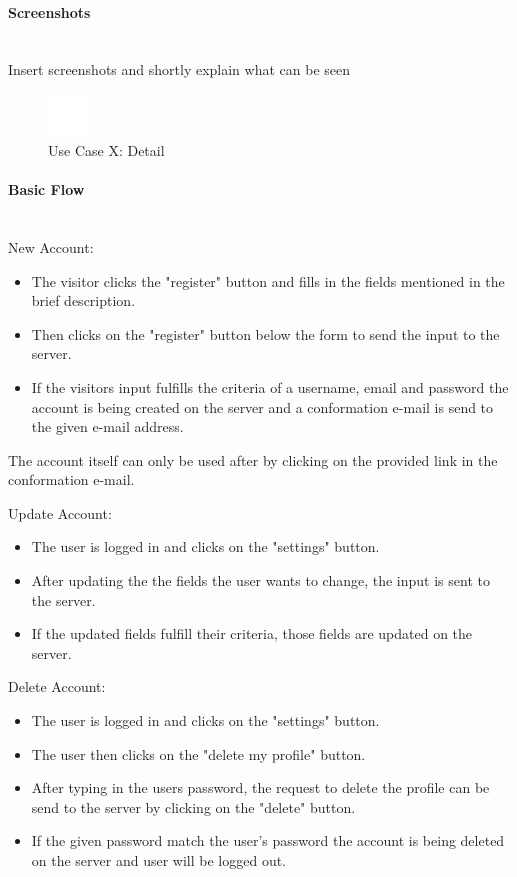 \paragraph*{Screenshots}\mbox{}\\
Insert screenshots and shortly explain what can be seen
\begin{figure}[h] 
	\centering
	\includegraphics[width=0.1\textwidth]{Content/Domain/placeholder.png}
	\caption{Use Case X: Detail}
	\label{fig:useCaseXDetailY}
\end{figure}

\newpage
\paragraph*{Basic Flow} \mbox{}\\
\noindent
New Account:
\begin{itemize}
	\vspace{-3mm}
	\setlength\itemsep{-1.5em}
	\item The visitor clicks the "register" button and fills in the fields mentioned in the brief description.
	\item Then clicks on the "register" button below the form to send the input to the server.
	\item If the visitors input fulfills the criteria of a username, email and password the account is being created on the server and a conformation e-mail is send to the given e-mail address.
\end{itemize}
The account itself can only be used after by clicking on the provided link in the conformation e-mail.


\noindent
Update Account: 
\begin{itemize}
	\vspace{-3mm}
	\setlength\itemsep{-1em}
	\item The user is logged in and clicks on the "settings" button.
	\item After updating the the fields the user wants to change, the input is sent to the server.
	\item If the updated fields fulfill their criteria, those fields are updated on the server.
\end{itemize} 

\noindent
Delete Account:
\begin{itemize}
	\vspace{-3mm}
	\setlength\itemsep{-1em}
	\item The user is logged in and clicks on the "settings" button.
	\item The user then clicks on the "delete my profile" button. 
	\item After typing in the users password, the request to delete the profile can be send to the server by clicking on the "delete" button.
	\item If the given password match the user's password the account is being deleted on the server and user will be logged out.
\end{itemize}

